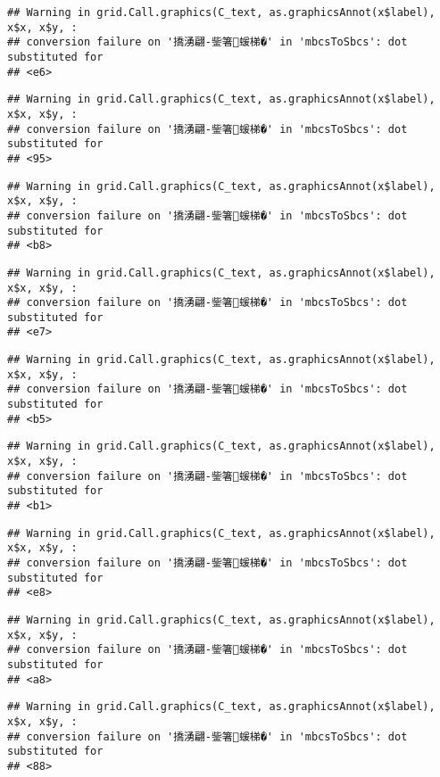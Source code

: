 \documentclass[
]{article}
\begin{document}
\begin{verbatim}
## Warning in grid.Call.graphics(C_text, as.graphicsAnnot(x$label), x$x, x$y, :
## conversion failure on '撟湧翩-鈭箸蝯梯�' in 'mbcsToSbcs': dot substituted for
## <e6>
\end{verbatim}

\begin{verbatim}
## Warning in grid.Call.graphics(C_text, as.graphicsAnnot(x$label), x$x, x$y, :
## conversion failure on '撟湧翩-鈭箸蝯梯�' in 'mbcsToSbcs': dot substituted for
## <95>
\end{verbatim}

\begin{verbatim}
## Warning in grid.Call.graphics(C_text, as.graphicsAnnot(x$label), x$x, x$y, :
## conversion failure on '撟湧翩-鈭箸蝯梯�' in 'mbcsToSbcs': dot substituted for
## <b8>
\end{verbatim}

\begin{verbatim}
## Warning in grid.Call.graphics(C_text, as.graphicsAnnot(x$label), x$x, x$y, :
## conversion failure on '撟湧翩-鈭箸蝯梯�' in 'mbcsToSbcs': dot substituted for
## <e7>
\end{verbatim}

\begin{verbatim}
## Warning in grid.Call.graphics(C_text, as.graphicsAnnot(x$label), x$x, x$y, :
## conversion failure on '撟湧翩-鈭箸蝯梯�' in 'mbcsToSbcs': dot substituted for
## <b5>
\end{verbatim}

\begin{verbatim}
## Warning in grid.Call.graphics(C_text, as.graphicsAnnot(x$label), x$x, x$y, :
## conversion failure on '撟湧翩-鈭箸蝯梯�' in 'mbcsToSbcs': dot substituted for
## <b1>
\end{verbatim}

\begin{verbatim}
## Warning in grid.Call.graphics(C_text, as.graphicsAnnot(x$label), x$x, x$y, :
## conversion failure on '撟湧翩-鈭箸蝯梯�' in 'mbcsToSbcs': dot substituted for
## <e8>
\end{verbatim}

\begin{verbatim}
## Warning in grid.Call.graphics(C_text, as.graphicsAnnot(x$label), x$x, x$y, :
## conversion failure on '撟湧翩-鈭箸蝯梯�' in 'mbcsToSbcs': dot substituted for
## <a8>
\end{verbatim}

\begin{verbatim}
## Warning in grid.Call.graphics(C_text, as.graphicsAnnot(x$label), x$x, x$y, :
## conversion failure on '撟湧翩-鈭箸蝯梯�' in 'mbcsToSbcs': dot substituted for
## <88>
\end{verbatim}
\end{document}
